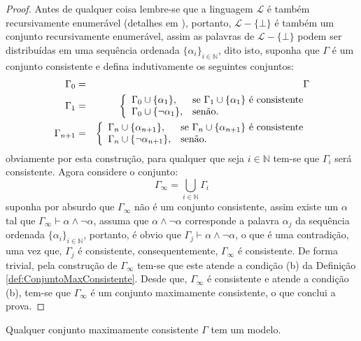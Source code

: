 \begin{proof}
  Antes de qualquer coisa lembre-se que a linguagem $\mathcal{L}$ é também recursivamente enumerável (detalhes em \cite{ullman1992}), portanto, $\mathcal{L} - \{\bot\}$ é também um conjunto recursivamente enumerável, assim as palavras de $\mathcal{L} - \{\bot\}$ podem ser distribuídas em uma sequência ordenada $\{\alpha_i\}_{i \in \mathbb{N}}$, dito isto, suponha que $\Gamma$ é um conjunto consistente e defina indutivamente os seguintes conjuntos:
  \begin{eqnarray*}
    \Gamma_0 & = & \Gamma\\
    \Gamma_1 & = & \left\{\begin{array}{ll}	\Gamma_0 \cup \{\alpha_1\}, & \hbox{se } \Gamma_1 \cup \{\alpha_1\} \hbox{ é consistente}\\ \Gamma_0 \cup \{\neg \alpha_1\},  & \hbox{senão.}\end{array}\right.\\
    \Gamma_{n+1} & = & \left\{\begin{array}{ll}	\Gamma_n \cup \{\alpha_{n+1}\}, & \hbox{se } \Gamma_n \cup \{\alpha_{n+1}\} \hbox{ é consistente}\\ \Gamma_n \cup \{\neg \alpha_{n+1}\},  & \hbox{senão.}\end{array}\right.
  \end{eqnarray*}
  obviamente por esta construção, para qualquer que seja $i \in \mathbb{N}$ tem-se que $\Gamma_i$ será consistente. Agora considere o conjunto:
  $$\Gamma_\infty = \bigcup_{i \in \mathbb{N}} \Gamma_i$$
  suponha por absurdo que $\Gamma_\infty$ não é um conjunto consistente,  assim existe um $\alpha$ tal que $\Gamma_\infty \vdash \alpha \land \neg \alpha$, assuma que $\alpha \land \neg \alpha$ corresponde a palavra $\alpha_j$ da sequência ordenada $\{\alpha_i\}_{i \in \mathbb{N}}$, portanto, é obvio que $\Gamma_j \vdash \alpha \land \neg \alpha$, o que é uma contradição, uma vez que, $\Gamma_j$ é consistente, consequentemente, $\Gamma_\infty$ é consistente. De forma trivial, pela construção de $\Gamma_\infty$ tem-se que este atende a condição (b) da Definição \ref{def:ConjuntoMaxConsistente}. Desde que, $\Gamma_\infty$ é consistente e atende a condição (b), tem-se que $\Gamma_\infty$ é um conjunto maximamente consistente, o que conclui a prova.
\end{proof}

\begin{teorema}\label{teo:ModeloParaMaximaneteConsistente}
  Qualquer conjunto maximamente consistente $\Gamma$ tem um modelo.
\end{teorema}

